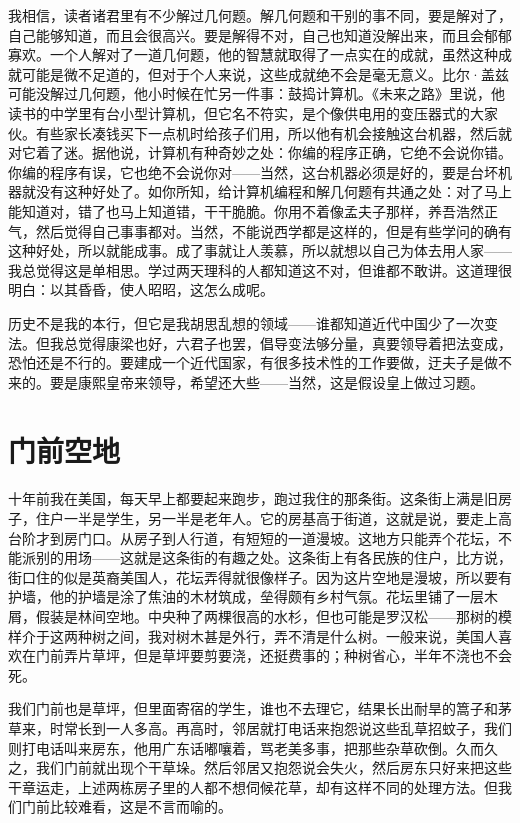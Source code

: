 我相信，读者诸君里有不少解过几何题。解几何题和干别的事不同，要是解对了，自己能够知道，而且会很高兴。要是解得不对，自己也知道没解出来，而且会郁郁寡欢。一个人解对了一道几何题，他的智慧就取得了一点实在的成就，虽然这种成就可能是微不足道的，但对于个人来说，这些成就绝不会是毫无意义。比尔·盖兹可能没解过几何题，他小时候在忙另一件事：鼓捣计算机。《未来之路》里说，他读书的中学里有台小型计算机，但它名不符实，是个像供电用的变压器式的大家伙。有些家长凑钱买下一点机时给孩子们用，所以他有机会接触这台机器，然后就对它着了迷。据他说，计算机有种奇妙之处：你编的程序正确，它绝不会说你错。你编的程序有误，它也绝不会说你对——当然，这台机器必须是好的，要是台坏机器就没有这种好处了。如你所知，给计算机编程和解几何题有共通之处：对了马上能知道对，错了也马上知道错，干干脆脆。你用不着像孟夫子那样，养吾浩然正气，然后觉得自己事事都对。当然，不能说西学都是这样的，但是有些学问的确有这种好处，所以就能成事。成了事就让人羡慕，所以就想以自己为体去用人家——我总觉得这是单相思。学过两天理科的人都知道这不对，但谁都不敢讲。这道理很明白：以其昏昏，使人昭昭，这怎么成呢。 

历史不是我的本行，但它是我胡思乱想的领域——谁都知道近代中国少了一次变法。但我总觉得康梁也好，六君子也罢，倡导变法够分量，真要领导着把法变成，恐怕还是不行的。要建成一个近代国家，有很多技术性的工作要做，迂夫子是做不来的。要是康熙皇帝来领导，希望还大些——当然，这是假设皇上做过习题。
 
\chapter{门前空地}

十年前我在美国，每天早上都要起来跑步，跑过我住的那条街。这条街上满是旧房子，住户一半是学生，另一半是老年人。它的房基高于街道，这就是说，要走上高台阶才到房门口。从房子到人行道，有短短的一道漫坡。这地方只能弄个花坛，不能派别的用场——这就是这条街的有趣之处。这条街上有各民族的住户，比方说，街口住的似是英裔美国人，花坛弄得就很像样子。因为这片空地是漫坡，所以要有护墙，他的护墙是涂了焦油的木材筑成，垒得颇有乡村气氛。花坛里铺了一层木屑，假装是林间空地。中央种了两棵很高的水杉，但也可能是罗汉松——那树的模样介于这两种树之间，我对树木甚是外行，弄不清是什么树。一般来说，美国人喜欢在门前弄片草坪，但是草坪要剪要浇，还挺费事的；种树省心，半年不浇也不会死。 

我们门前也是草坪，但里面寄宿的学生，谁也不去理它，结果长出耐旱的篙子和茅草来，时常长到一人多高。再高时，邻居就打电话来抱怨说这些乱草招蚊子，我们则打电话叫来房东，他用广东话嘟嚷着，骂老美多事，把那些杂草砍倒。久而久之，我们门前就出现个干草垛。然后邻居又抱怨说会失火，然后房东只好来把这些干章运走，上述两栋房子里的人都不想伺候花草，却有这样不同的处理方法。但我们门前比较难看，这是不言而喻的。 

